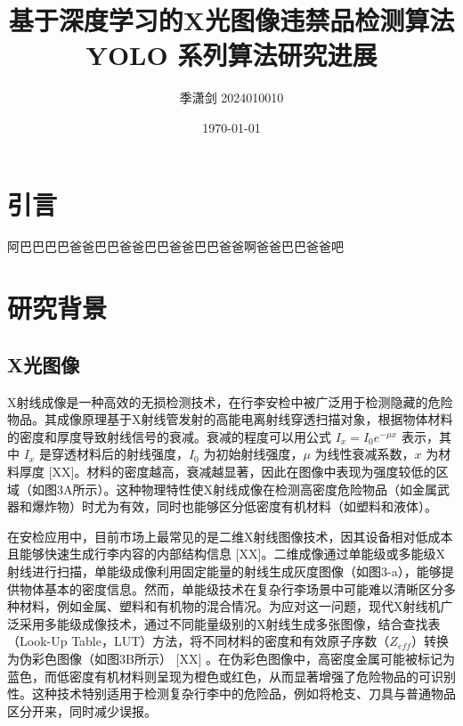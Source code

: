 \documentclass[11pt,twocolumn]{ctexart}
\begin{document}
\title{\textbf{基于深度学习的X光图像违禁品检测算法}\\[1ex]YOLO 系列算法研究进展}
\author{季潇剑 2024010010}
\date{\today}

\section{引言}
阿巴巴巴巴爸爸巴巴爸爸巴巴爸爸巴巴爸爸啊爸爸巴巴爸爸吧

\section{研究背景}


\subsection{X光图像}
X射线成像是一种高效的无损检测技术，在行李安检中被广泛用于检测隐藏的危险物品。其成像原理基于X射线管发射的高能电离射线穿透扫描对象，根据物体材料的密度和厚度导致射线信号的衰减。衰减的程度可以用公式 $I_x = I_0 e^{-\mu x}$ 表示，其中 $I_x$ 是穿透材料后的射线强度，$I_0$ 为初始射线强度，$\mu$ 为线性衰减系数，$x$ 为材料厚度 [XX]。材料的密度越高，衰减越显著，因此在图像中表现为强度较低的区域（如图3A所示）。这种物理特性使X射线成像在检测高密度危险物品（如金属武器和爆炸物）时尤为有效，同时也能够区分低密度有机材料（如塑料和液体）。

在安检应用中，目前市场上最常见的是二维X射线图像技术，因其设备相对低成本且能够快速生成行李内容的内部结构信息 [XX]。二维成像通过单能级或多能级X射线进行扫描，单能级成像利用固定能量的射线生成灰度图像（如图3-a），能够提供物体基本的密度信息。然而，单能级技术在复杂行李场景中可能难以清晰区分多种材料，例如金属、塑料和有机物的混合情况。为应对这一问题，现代X射线机广泛采用多能级成像技术，通过不同能量级别的X射线生成多张图像，结合查找表（Look-Up Table，LUT）方法，将不同材料的密度和有效原子序数（$Z_{eff}$）转换为伪彩色图像（如图3B所示） [XX] 。在伪彩色图像中，高密度金属可能被标记为蓝色，而低密度有机材料则呈现为橙色或红色，从而显著增强了危险物品的可识别性。这种技术特别适用于检测复杂行李中的危险品，例如将枪支、刀具与普通物品区分开来，同时减少误报。
\end{document}
